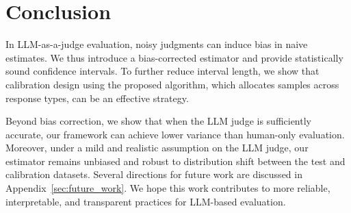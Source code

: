 \section{Conclusion}\label{sec:conclusion}

In LLM-as-a-judge evaluation, noisy judgments can induce bias in naive estimates. We thus introduce a bias-corrected estimator and provide statistically sound confidence intervals. To further reduce interval length, we show that calibration design using the proposed algorithm, which allocates samples across response types, can be an effective strategy.

Beyond bias correction, we show that when the LLM judge is sufficiently accurate, our framework can achieve lower variance than human-only evaluation. Moreover, under a mild and realistic assumption on the LLM judge, our estimator remains unbiased and robust to distribution shift between the test and calibration datasets. Several directions for future work are discussed in Appendix~\ref{sec:future_work}. We hope this work contributes to more reliable, interpretable, and transparent practices for LLM-based evaluation.